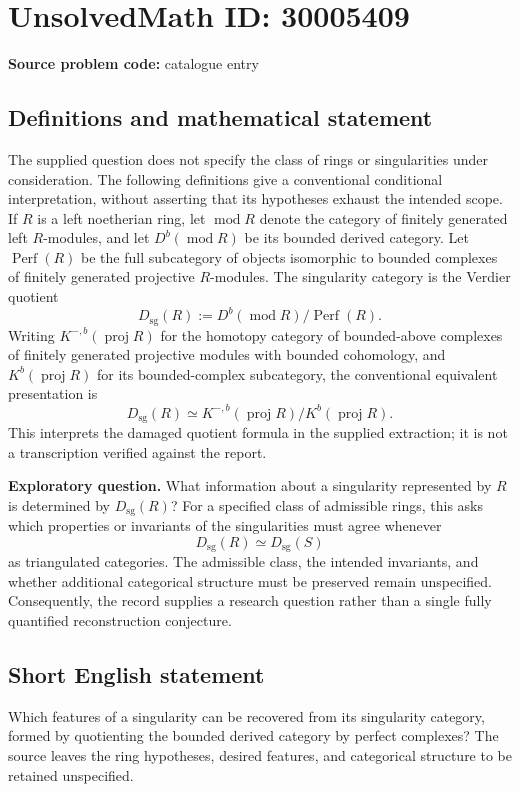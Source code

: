 \documentclass[11pt]{article}
\begin{document}
\section*{UnsolvedMath ID: 30005409}
\textbf{Source problem code:} catalogue entry
\subsection{Definitions and mathematical statement}
The supplied question does not specify the class of rings or singularities under consideration. The following definitions give a conventional conditional interpretation, without asserting that its hypotheses exhaust the intended scope. If \(R\) is a left noetherian ring, let \(\operatorname{mod}R\) denote the category of finitely generated left \(R\)-modules, and let \(D^b(\operatorname{mod}R)\) be its bounded derived category. Let \(\operatorname{Perf}(R)\) be the full subcategory of objects isomorphic to bounded complexes of finitely generated projective \(R\)-modules. The singularity category is the Verdier quotient
\[
D_{\mathrm{sg}}(R):=D^b(\operatorname{mod}R)/\operatorname{Perf}(R).
\]
Writing \(K^{-,b}(\operatorname{proj}R)\) for the homotopy category of bounded-above complexes of finitely generated projective modules with bounded cohomology, and \(K^b(\operatorname{proj}R)\) for its bounded-complex subcategory, the conventional equivalent presentation is
\[
D_{\mathrm{sg}}(R)\simeq K^{-,b}(\operatorname{proj}R)/K^b(\operatorname{proj}R).
\]
This interprets the damaged quotient formula in the supplied extraction; it is not a transcription verified against the report.

\textbf{Exploratory question.} What information about a singularity represented by \(R\) is determined by \(D_{\mathrm{sg}}(R)\)? For a specified class of admissible rings, this asks which properties or invariants of the singularities must agree whenever
\[
D_{\mathrm{sg}}(R)\simeq D_{\mathrm{sg}}(S)
\]
as triangulated categories. The admissible class, the intended invariants, and whether additional categorical structure must be preserved remain unspecified. Consequently, the record supplies a research question rather than a single fully quantified reconstruction conjecture.
\subsection{Short English statement}
Which features of a singularity can be recovered from its singularity category, formed by quotienting the bounded derived category by perfect complexes? The source leaves the ring hypotheses, desired features, and categorical structure to be retained unspecified.
\end{document}
